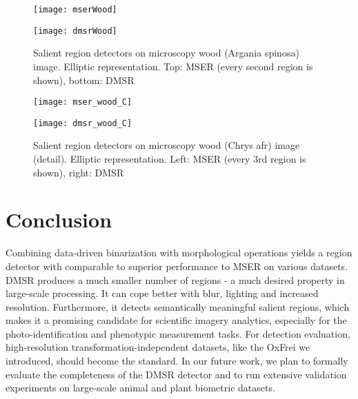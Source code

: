 \documentclass[conference,compsoc]{IEEEtran}
\begin{document}
 
\begin{figure}[htb]
\begin{minipage}[b]{.99\linewidth}
  \centering
  \centerline{\texttt{[image: mserWood]}}
\end{minipage}
\hfill
\vspace{0.2cm}
\begin{minipage}[b]{0.99\linewidth}
  \centering
  \centerline{\texttt{[image: dmsrWood]}}
\end{minipage}
\vspace{-0.1cm}
\caption{Salient region detectors on microscopy wood (Argania spinosa) image. Elliptic representation. Top: MSER (every second region is shown), bottom: DMSR}
\label{fig:wood}
\end{figure}

\begin{figure}[htb]
\begin{minipage}[b]{.49\linewidth}
  \centering
  \centerline{\texttt{[image: mser\_wood\_C]}}
\end{minipage}
\hfill
\begin{minipage}[b]{0.49\linewidth}
  \centering
  \centerline{\texttt{[image: dmsr\_wood\_C]}}
\end{minipage}
\vspace{-0.25cm}
\caption{Salient region detectors on microscopy wood (Chrys afr) image (detail). Elliptic representation. Left: MSER (every $3$rd region is shown), right: DMSR}
\label{fig:wood_C}

\end{figure}

\section{Conclusion}

Combining data-driven binarization with morphological operations yields a region detector with comparable to superior performance to MSER on various datasets. DMSR produces a much smaller number of regions - a much desired property in large-scale processing. It can cope better with blur, lighting and increased resolution. Furthermore, it detects semantically meaningful salient regions, which makes it a promising candidate for scientific imagery analytics, especially for the photo-identification and phenotypic measurement tasks. For detection evaluation, high-resolution transformation-independent datasets, like the OxFrei we introduced, should become the standard. In our future work, we plan to formally evaluate the completeness of the DMSR detector and to run extensive validation experiments on large-scale animal and plant biometric datasets.
\end{document}

